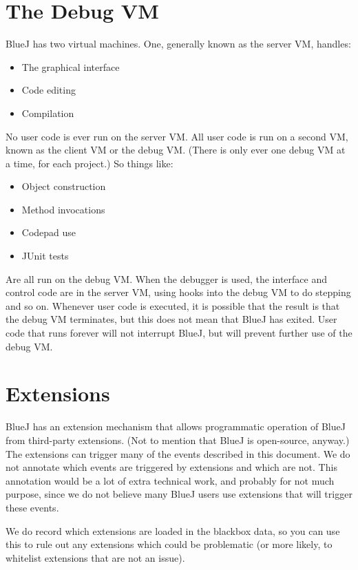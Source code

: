 \documentclass{report}
\begin{document}
\section{The Debug VM}

BlueJ has two virtual machines.  One, generally known as the server VM,
handles:

\begin{itemize}
\item The graphical interface
\item Code editing
\item Compilation
\end{itemize}

No user code is ever run on the server VM.  All user code is run on a second
VM, known as the client VM or the debug VM.  (There is only ever one debug VM
at a time, for each project.)  So things like:

\begin{itemize}
\item Object construction
\item Method invocations
\item Codepad use
\item JUnit tests
\end{itemize}

Are all run on the debug VM.  When the debugger is used, the interface and
control code are in the server VM, using hooks into the debug VM to do
stepping and so on.  Whenever user code is executed, it is possible that the
result is that the debug VM terminates, but this does not mean that BlueJ has
exited.  User code that runs forever will not interrupt BlueJ, but will
prevent further use of the debug VM.


\section{Extensions}

BlueJ has an extension mechanism that allows programmatic operation of BlueJ
from third-party extensions.  (Not to mention that BlueJ is open-source,
anyway.)  The extensions can trigger many of the events described in this
document.  We do not annotate which events are triggered by extensions and
which are not.  This annotation would be a lot of extra technical work, and
probably for not much purpose, since we do not believe many BlueJ users use
extensions that will trigger these events.

We do record which extensions are loaded in the blackbox data, so you can use
this to rule out any extensions which could be problematic (or more likely, to
whitelist extensions that are not an issue).
\end{document}
